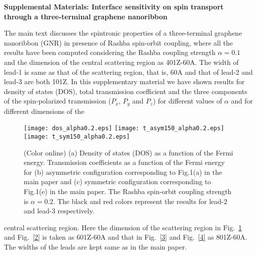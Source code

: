 \documentclass[prb,aps,twocolumn,amsmath,amssymb,floatfix,
superscriptaddress]{revtex4}
\begin{document}
\pagebreak
\widetext
\begin{center}
\textbf{\large Supplemental Materials: Interface sensitivity on spin
  transport through a three-terminal graphene nanoribbon}
\end{center}
\setcounter{equation}{0}
\setcounter{figure}{0}
\setcounter{table}{0}
\setcounter{page}{1}
\makeatletter
\renewcommand{\theequation}{S\arabic{equation}}
\renewcommand{\thefigure}{S\arabic{figure}}
\renewcommand{\bibnumfmt}[1]{[S#1]}
\renewcommand{\citenumfont}[1]{S#1}


The main text discusses the spintronic properties of a three-terminal
graphene nanoribbon (GNR) in presence of Rashba spin-orbit
coupling, where all the results have been computed considering the Rashba coupling strength
$\alpha=0.1$ and the dimension of the central scattering region as
401Z-60A. The width of lead-1 is same as that of the scattering
region, that is, 60A and that of lead-2 and lead-3 are both 101Z. In
this supplementary material we have shown results for density of
states (DOS), total transmission coefficient and the three components
of the spin-polarized transmission ($P_x$, $P_y$ and $P_z$) for
different values of $\alpha$ and for different dimensions of the
\begin{figure}[h]
\hfill
\texttt{[image: dos\_alpha0.2.eps]}\hfill
\texttt{[image: t\_asym150\_alpha0.2.eps]}\hfill
\texttt{[image: t\_sym150\_alpha0.2.eps]}\hfill
\caption{(Color online) (a) Density of states (DOS) as a function of
  the Fermi energy. Transmission coefficients as a function of the
  Fermi energy for (b) asymmetric configuration corresponding to
  Fig.1(a) in the main paper and (c) symmetric configuration
  corresponding to Fig.1(e) in the main paper. The Rashba spin-orbit
  coupling strength is $\alpha=0.2$. The black and red colors
  represent the results for lead-2 and lead-3 respectively.}
\label{1}
\end{figure}
central scattering region. Here the dimension of the scattering region
in Fig.~\ref{1} and Fig.~\ref{2} is taken as 601Z-60A and that in
Fig.~\ref{3} and Fig.~\ref{4} as 801Z-60A. The widths of the leads are
kept same as in the main paper.
\end{document}
